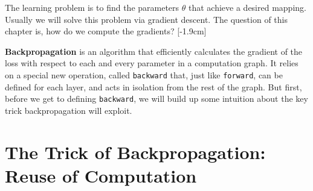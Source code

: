 

The learning problem is to find the parameters {\setlength{\fboxsep}{2pt}\colorbox{comp_graph_param_bcolor}{$\theta$}} that achieve a desired mapping. Usually we will solve this problem via gradient descent. The question of this chapter is, how do we compute the gradients?
[-1.9cm]

\textbf{Backpropagation} is an algorithm that efficiently calculates the gradient of the loss with respect to each and every parameter in a computation graph. It relies on a special new operation, called \texttt{backward} that, just like \texttt{forward}, can be defined for each layer, and acts in isolation from the rest of the graph. But first, before we get to defining \texttt{backward}, we will build up some intuition about the key trick backpropagation will exploit.

\section{The Trick of Backpropagation: Reuse of Computation}

